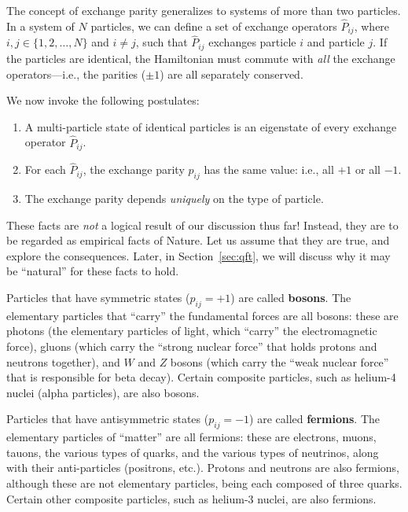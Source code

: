 \documentclass[pra,11pt]{revtex4}
\begin{document}
The concept of exchange parity generalizes to systems of more than two
particles.  In a system of $N$ particles, we can define a set of
exchange operators $\hat{P}_{ij}$, where $i,j\in\{1,2,\dots,N\}$ and
$i\ne j$, such that $\hat{P}_{ij}$ exchanges particle $i$ and particle
$j$.  If the particles are identical, the Hamiltonian must commute
with \textit{all} the exchange operators---i.e., the parities ($\pm
1$) are all separately conserved.

We now invoke the following postulates:
\begin{enumerate}
\item A multi-particle state of identical particles is an eigenstate
  of every exchange operator $\hat{P}_{ij}$.

\item For each $\hat{P}_{ij}$, the exchange parity $p_{ij}$ has the
  same value: i.e., all $+1$ or all $-1$.

\item The exchange parity depends \textit{uniquely} on the type of
  particle.
\end{enumerate}
These facts are \textit{not} a logical result of our discussion thus
far!  Instead, they are to be regarded as empirical facts of Nature.
Let us assume that they are true, and explore the consequences.
Later, in Section~\ref{sec:qft}, we will discuss why it may be
``natural'' for these facts to hold.

Particles that have symmetric states ($p_{ij} = +1$) are called
\textbf{bosons}.  The elementary particles that ``carry'' the
fundamental forces are all bosons: these are photons (the elementary
particles of light, which ``carry'' the electromagnetic force), gluons
(which carry the ``strong nuclear force'' that holds protons and
neutrons together), and $W$ and $Z$ bosons (which carry the ``weak
nuclear force'' that is responsible for beta decay).  Certain
composite particles, such as helium-4 nuclei (alpha particles), are
also bosons.

Particles that have antisymmetric states ($p_{ij} = -1$) are called
\textbf{fermions}.  The elementary particles of ``matter'' are all
fermions: these are electrons, muons, tauons, the various types of
quarks, and the various types of neutrinos, along with their
anti-particles (positrons, etc.).  Protons and neutrons are also
fermions, although these are not elementary particles, being each
composed of three quarks.  Certain other composite particles, such as
helium-3 nuclei, are also fermions.
\end{document}
